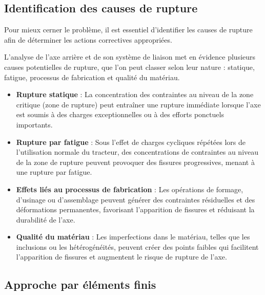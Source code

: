 \documentclass{rapportECL}
\begin{document}
\subsection{Identification des causes de rupture}
Pour mieux cerner le problème, il est essentiel d’identifier les causes de rupture afin de déterminer les actions correctives appropriées.  

L’analyse de l’axe arrière et de son système de liaison met en évidence plusieurs causes potentielles de rupture, que l’on peut classer selon leur nature : statique, fatigue, processus de fabrication et qualité du matériau.


\begin{itemize}
    \item \textbf{Rupture statique} : 
    La concentration des contraintes au niveau de la zone critique (zone de rupture) peut entraîner une rupture immédiate lorsque l’axe est soumis à des charges exceptionnelles ou à des efforts ponctuels importants.  

    \item \textbf{Rupture par fatigue} : 
    Sous l’effet de charges cycliques répétées lors de l’utilisation normale du tracteur, des concentrations de contraintes au niveau de la zone de rupture peuvent provoquer des fissures progressives, menant à une rupture par fatigue.  
    \item \textbf{Effets liés au processus de fabrication} : 
    Les opérations de formage, d’usinage ou d’assemblage peuvent générer des contraintes résiduelles et des déformations permanentes, favorisant l’apparition de fissures et réduisant la durabilité de l’axe.

    \item \textbf{Qualité du matériau} : 
    Les imperfections dans le matériau, telles que les inclusions ou les hétérogénéités, peuvent créer des points faibles qui facilitent l’apparition de fissures et augmentent le risque de rupture de l’axe.

\end{itemize}


\subsection{Approche par éléments finis}
 
\end{document}
